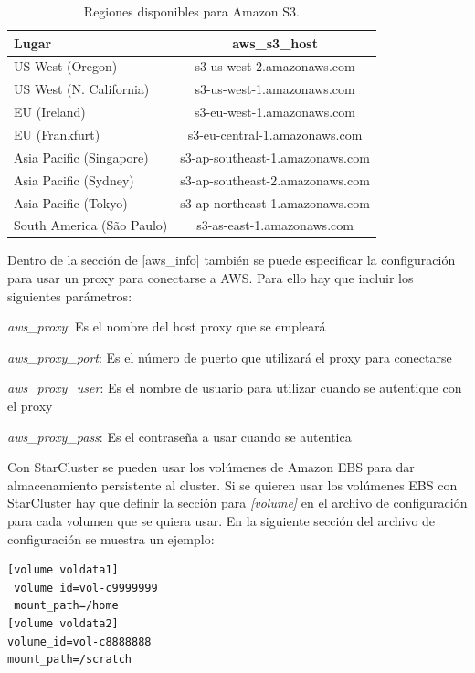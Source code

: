 \documentclass{article}
\begin{document}
\begin{table}[h]
	\begin{center}
		\caption{Regiones disponibles para Amazon S3.}
		\begin{tabular}{|l|c|}
\hline
\textbf{Lugar} &
\textbf{aws\_s3\_host} \\ \hline
\hline
US West (Oregon)            &  s3-us-west-2.amazonaws.com \\ \hline
US West (N. California)     &  s3-us-west-1.amazonaws.com \\ \hline
EU (Ireland)                       &  s3-eu-west-1.amazonaws.com \\ \hline
EU (Frankfurt)                   & s3-eu-central-1.amazonaws.com \\ \hline
Asia Pacific (Singapore)     & s3-ap-southeast-1.amazonaws.com \\ \hline
Asia Pacific (Sydney)         & s3-ap-southeast-2.amazonaws.com \\ \hline
Asia Pacific (Tokyo)            & s3-ap-northeast-1.amazonaws.com \\ \hline
South America (São Paulo) & s3-as-east-1.amazonaws.com \\ \hline
		\end{tabular}
		\label{tab:s3-endpoint}
	\end{center}
\end{table}

	Dentro de la sección de [aws\_info] también se puede especificar la configuración para usar un proxy para conectarse a AWS. Para ello hay que incluir los siguientes parámetros:
{\setlength{\parskip}{0mm} \begin{itemize}
{\setlength{\parskip}{0mm}
	\item 	\emph{aws\_proxy}: Es el nombre del host proxy que se empleará
	\item 	\emph{aws\_proxy\_port}: Es el número de puerto que utilizará el proxy para conectarse
	\item 	\emph{aws\_proxy\_user}: Es el nombre de usuario para utilizar cuando se autentique con el proxy
	\item 	\emph{aws\_proxy\_pass}: Es el contraseña a usar cuando se autentica 
}\end{itemize} }

	Con StarCluster se pueden usar los volúmenes de Amazon EBS para dar almacenamiento persistente al cluster. Si se quieren usar los volúmenes EBS con StarCluster hay que definir la sección para \emph{[volume]} en el archivo de configuración para cada volumen que se quiera usar. En la siguiente sección del archivo de configuración se muestra un ejemplo:
\begin{lstlisting}
[volume voldata1]
 volume_id=vol-c9999999
 mount_path=/home
[volume voldata2]
volume_id=vol-c8888888
mount_path=/scratch
\end{lstlisting}
\end{document}

